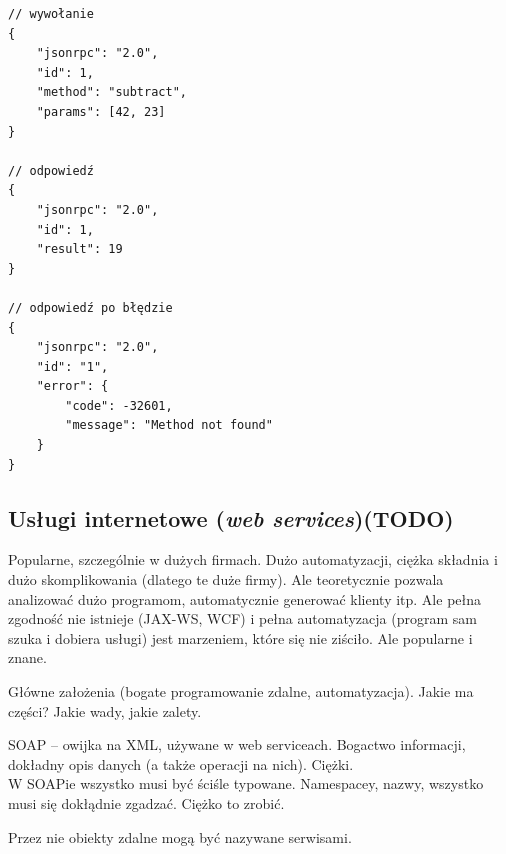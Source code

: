 \begin{lstlisting}[float, frame=single, caption={Przykłady wiadomości w~JSON-RPC.}, label=kod:json-rpc-examples]
// wywołanie
{
	"jsonrpc": "2.0",
	"id": 1,
	"method": "subtract",
	"params": [42, 23]
}

// odpowiedź
{
	"jsonrpc": "2.0",
	"id": 1,
	"result": 19
}

// odpowiedź po błędzie
{
	"jsonrpc": "2.0",
	"id": "1",
	"error": {
		"code": -32601,
		"message": "Method not found"
	}
}
\end{lstlisting}


\subsection{Usługi internetowe (\emph{web services})(TODO)}
Popularne, szczególnie w dużych firmach. Dużo automatyzacji, ciężka składnia i dużo skomplikowania (dlatego te duże firmy).
Ale teoretycznie pozwala analizować dużo programom, automatycznie generować klienty itp. Ale pełna zgodność nie istnieje (JAX-WS, WCF) i pełna automatyzacja (program sam szuka i dobiera usługi) jest marzeniem, które się nie ziściło. Ale popularne i znane.

Główne założenia (bogate programowanie zdalne, automatyzacja). Jakie ma części? Jakie wady, jakie zalety.

SOAP -- owijka na XML, używane w web serviceach. Bogactwo informacji, dokładny opis danych (a także operacji na nich). Ciężki.\\
W SOAPie wszystko musi być ściśle typowane. Namespacey, nazwy, wszystko musi się dokłądnie zgadzać. Ciężko to zrobić.

Przez nie obiekty zdalne mogą być nazywane serwisami.

